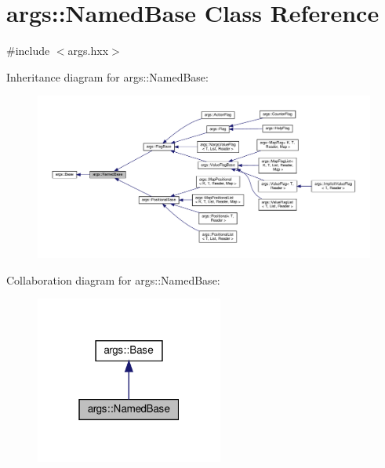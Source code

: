 \hypertarget{classargs_1_1_named_base}{}\section{args\+:\+:Named\+Base Class Reference}
\label{classargs_1_1_named_base}


{\ttfamily \#include $<$args.\+hxx$>$}



Inheritance diagram for args\+:\+:Named\+Base\+:\nopagebreak
\begin{figure}[H]
\begin{center}
\leavevmode
\includegraphics[width=350pt]{classargs_1_1_named_base__inherit__graph}
\end{center}
\end{figure}


Collaboration diagram for args\+:\+:Named\+Base\+:\nopagebreak
\begin{figure}[H]
\begin{center}
\leavevmode
\includegraphics[width=175pt]{classargs_1_1_named_base__coll__graph}
\end{center}
\end{figure}
